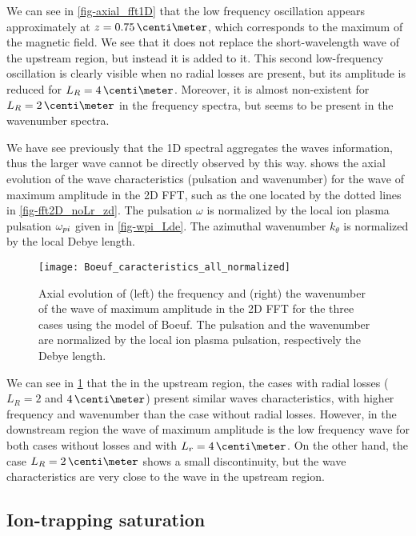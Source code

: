 We can see in \cref{fig-axial_fft1D} that the low frequency oscillation appears approximately at $z=0.75\,\centi\meter$, which corresponds to the maximum of the magnetic field.
We see that it does not replace the short-wavelength wave of the upstream region, but instead it is added to it.
This second low-frequency oscillation is clearly visible when no radial losses are present, but its amplitude is reduced for $L_R=4\,\centi\meter$.
Moreover, it is almost non-existent for $L_R=2\,\centi\meter$ in the frequency spectra, but seems to be present in the wavenumber spectra.

We have see previously that the \ac{1D} spectral aggregates the waves information, thus the larger wave cannot be directly observed by this way.
 shows the axial evolution of the wave characteristics (pulsation and wavenumber) for the wave of maximum amplitude in the \ac{2D} \ac{FFT}, such as the one located by the dotted lines in \cref{fig-fft2D_noLr_zd}.
The pulsation $\omega$ is normalized by the local ion plasma pulsation $\omega_{pi}$ given in \cref{fig-wpi_Lde}.
The azimuthal wavenumber $k_{\theta}$ is normalized by the local Debye length.
 
\begin{figure}[hbt]
  \centering
  \texttt{[image: Boeuf\_caracteristics\_all\_normalized]}
  \caption{Axial evolution of (left) the frequency and (right) the wavenumber of the wave of maximum amplitude in the \ac{2D} \ac{FFT} for the three cases using the model of Boeuf. The pulsation and the wavenumber are normalized by the local ion plasma pulsation, respectively the Debye length.}
  \label{fig-axial_maxwave_normalized}
\end{figure}

We can see in \cref{fig-axial_maxwave_normalized} that the in the upstream region, the cases with radial losses ($L_R=2$ and $4\,\centi\meter$) present similar waves characteristics, with higher frequency and wavenumber than the case without radial losses.
However, in the downstream region the wave of maximum amplitude is the low frequency wave for both cases without losses and with $L_r=4\,\centi\meter$.
On the other hand, the case $L_R=2\,\centi\meter$ shows a small discontinuity, but the wave characteristics are very close to the wave in the upstream region.

\FloatBarrier
\subsection{Ion-trapping saturation } \label{subsec-boeuf_iontrapping}

